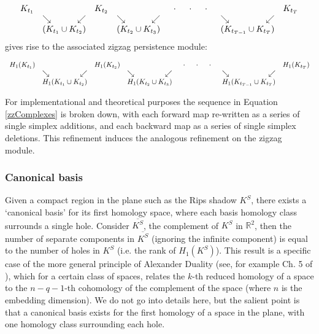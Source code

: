 \documentclass[12pt]{article}
\begin{document}
\begin{equation}\label{zzComplexes}
\begin{array}{rlrclrccclrl}
K_{t_1} & & & K_{t_2} & & & \mbox{ } \cdot \mbox{ } & \cdot & \mbox{ } \cdot \mbox{ } & & & K_{t_T} \\
& \searrow & \swarrow & & \searrow & \swarrow & & & & \searrow & \swarrow & \\
& \multicolumn{2}{c}{(K_{t_1} \cup K_{t_2})} & & \multicolumn{2}{c}{(K_{t_2} \cup K_{t_3})} & & & & \multicolumn{2}{c}{(K_{t_{T-1}} \cup K_{t_T})} & \\
\end{array}
\end{equation}
gives rise to the associated zigzag persistence module:

\begin{footnotesize}
\[ \begin{array}{rlrclrccclrl}
H_1(K_{t_1}) & & & H_1(K_{t_2}) & & & \mbox{ } \cdot \mbox{ } & \cdot & \mbox{ } \cdot \mbox{ } & & & H_1(K_{t_T}) \\
& \searrow & \swarrow & & \searrow & \swarrow & & & & \searrow & \swarrow & \\
& \multicolumn{2}{c}{H_1(K_{t_1} \cup K_{t_2})} & & \multicolumn{2}{c}{H_1(K_{t_2} \cup K_{t_3})} & & & & \multicolumn{2}{c}{H_1(K_{t_{T-1}} \cup K_{t_T})} & \\
\end{array} \]
\end{footnotesize}

For implementational and theoretical purposes the sequence in Equation \ref{zzComplexes} is broken down, with each forward map re-written as a series of single simplex additions, and each backward map as a series of single simplex deletions. This refinement induces the analogous refinement on the zigzag module.


\subsubsection{Canonical basis}\label{Canonical}

Given a compact region in the plane such as the Rips shadow $K^S$, there exists a `canonical basis' for its first homology space, where each basis homology class surrounds a single hole. Consider $\overline{K^S}$, the complement of $K^S$ in $\mathbb{R}^2$, then the number of separate components in $\overline{K^S}$ (ignoring the infinite component) is equal to the number of holes in $K^S$ (i.e. the rank of $H_1(K^S)$). This result is a specific case of the more general principle of Alexander Duality (see, for example Ch. 5 of \cite{Miller2005}), which for a certain class of spaces, relates the $k$-th reduced homology of a space to the $n-q-1$-th cohomology of the complement of the space (where $n$ is the embedding dimension). We do not go into details here, but the salient point is that a canonical basis exists for the first homology of a space in the plane, with one homology class surrounding each hole.
\end{document}
